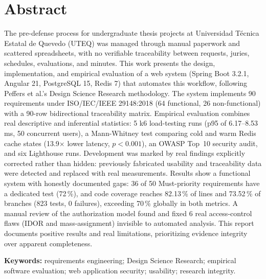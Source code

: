 \section*{Abstract}

The pre-defense process for undergraduate thesis projects at Universidad Técnica Estatal de Quevedo
(UTEQ) was managed through manual paperwork and scattered spreadsheets, with no verifiable traceability
between requests, juries, schedules, evaluations, and minutes. This work presents the design,
implementation, and empirical evaluation of a web system (Spring Boot 3.2.1, Angular 21, PostgreSQL 15,
Redis 7) that automates this workflow, following Peffers et al.'s Design Science Research methodology.
The system implements 90 requirements under ISO/IEC/IEEE 29148:2018 (64 functional, 26 non-functional)
with a 90-row bidirectional traceability matrix. Empirical evaluation combines real descriptive and
inferential statistics: 5 k6 load-testing runs (p95 of 6.17--8.53\,ms, 50 concurrent users), a
Mann-Whitney test comparing cold and warm Redis cache states (13.9$\times$ lower latency, $p<0.001$), an
OWASP Top~10 security audit, and six Lighthouse runs. Development was marked by real findings explicitly
corrected rather than hidden: previously fabricated usability and traceability data were detected and
replaced with real measurements. Results show a functional system with honestly documented gaps: 36 of
50 Must-priority requirements have a dedicated test (72\,\%), and code coverage reaches 82.13\,\% of
lines and 73.52\,\% of branches (823 tests, 0 failures), exceeding 70\,\% globally in both metrics. A manual review of the
authorization model found and fixed 6 real access-control flaws (IDOR and mass-assignment) invisible to
automated analysis. This report documents positive results and real limitations, prioritizing evidence
integrity over apparent completeness.

\textbf{Keywords:} requirements engineering; Design Science Research; empirical software evaluation; web
application security; usability; research integrity.
\newpage

